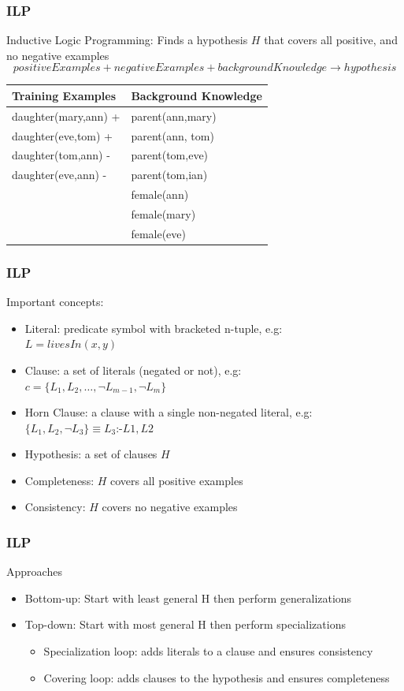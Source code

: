 \documentclass{beamer}
\begin{document}
\begin{frame}
\frametitle{ILP}
 Inductive Logic Programming: Finds a hypothesis $H$ that covers all positive, and no negative examples
  \begin{equation}
   positiveExamples + negativeExamples + background Knowledge \rightarrow hypothesis
  \end{equation}

\begin{table}
\begin{tabular}{| l | l |}
\toprule
\textbf{Training Examples} & \textbf{Background Knowledge}\\
\midrule
daughter(mary,ann) +	& parent(ann,mary)	\\
daughter(eve,tom) +	& parent(ann, tom)	\\
daughter(tom,ann) - 	& parent(tom,eve)	\\
daughter(eve,ann) -	& parent(tom,ian) 	\\
			& female(ann)		\\
			& female(mary)		\\
			& female(eve)		\\
\bottomrule
\end{tabular}
\end{table}
\end{frame}

\begin{frame}
\frametitle{ILP}
Important concepts:
  \begin{itemize}
   \item Literal: predicate symbol with bracketed n-tuple, e.g: \\ \quad $L=livesIn(x,y)$
   \item Clause: a set of literals (negated or not), e.g: \\ \quad $c=\{L_1,L_2,\ldots,\neg L_{m-1}, \neg L_{m}\}$
   \item Horn Clause: a clause with a single non-negated literal, e.g: \\ \quad$\{L_1,L_2,\neg L_3\} \equiv
L_3$:-$L1,L2$
   \item Hypothesis: a set of clauses $H$
   \item Completeness: $H$ covers all positive examples
   \item Consistency: $H$ covers no negative examples
  \end{itemize}
\end{frame}

\begin{frame}
\frametitle{ILP}
Approaches
  \begin{itemize}
   \item Bottom-up: Start with least general H then perform generalizations
   \item Top-down: Start with most general H then perform specializations
   \begin{itemize}
    \item Specialization loop: adds literals to a clause and ensures consistency
    \item Covering loop: adds clauses to the hypothesis and ensures completeness
   \end{itemize}
  \end{itemize}
\end{frame}
\end{document}
